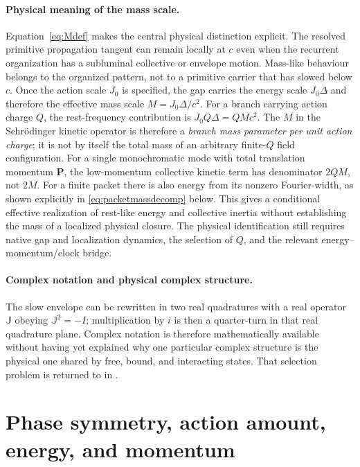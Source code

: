 \documentclass[11pt]{article}
\theoremstyle{definition}
\begin{document}
\paragraph{Physical meaning of the mass scale.}
Equation~\eqref{eq:Mdef} makes the central physical distinction explicit.  The resolved
primitive propagation tangent can remain locally at $c$ even when the recurrent organization
has a subluminal collective or envelope motion.  Mass-like behaviour belongs to the organized
pattern, not to a primitive carrier that has slowed below $c$.  Once the action scale $J_0$ is
specified, the gap carries the energy scale $J_0\Delta$ and therefore the effective mass scale
$M=J_0\Delta/c^2$.  For a branch carrying action charge $Q$, the rest-frequency contribution
is $J_0Q\Delta=QMc^2$.  The $M$ in the Schr\"odinger kinetic operator is
therefore a \emph{branch mass parameter per unit action charge}; it is not
by itself the total mass of an arbitrary finite-$Q$ field configuration.
For a single monochromatic mode with total translation momentum $\mathbf P$,
the low-momentum collective kinetic term has denominator $2QM$, not $2M$.
For a finite packet there is also energy from its nonzero Fourier-width, as
shown explicitly in \eqref{eq:packetmassdecomp} below.  This gives a
conditional effective realization of rest-like energy and collective inertia
without establishing the mass of a localized physical closure.  The physical
identification still requires native gap and localization dynamics, the
selection of $Q$, and the relevant energy--momentum/clock bridge.

\paragraph{Complex notation and physical complex structure.}
The slow envelope can be rewritten in two real quadratures with a real operator $\mathbb J$
obeying $\mathbb J^2=-I$; multiplication by $i$ is then a quarter-turn in that real
quadrature plane.  Complex notation is therefore mathematically available without having yet
explained why one particular complex structure is the physical one shared by free, bound, and
interacting states.  That selection problem is returned to in
.

\section{Phase symmetry, action amount, energy, and momentum}
\label{sec:actionbridge}
\end{document}
